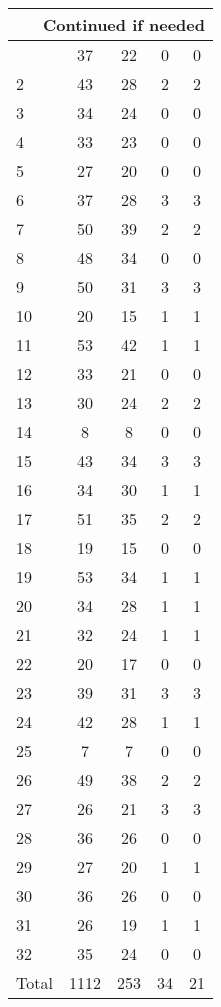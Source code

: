 \begin{center}
\begin{longtable}{l|c|c|c|c}
\hline \multicolumn{5}{|r|}{{Continued if needed}} \\ \hline
\endfoot 
1 & 37 & 22 & 0 & 0\\ \hline
2 & 43 & 28 & 2 & 2\\ \hline
3 & 34 & 24 & 0 & 0\\ \hline
4 & 33 & 23 & 0 & 0\\ \hline
5 & 27 & 20 & 0 & 0\\ \hline
6 & 37 & 28 & 3 & 3\\ \hline
7 & 50 & 39 & 2 & 2\\ \hline
8 & 48 & 34 & 0 & 0\\ \hline
9 & 50 & 31 & 3 & 3\\ \hline
10 & 20 & 15 & 1 & 1\\ \hline
11 & 53 & 42 & 1 & 1\\ \hline
12 & 33 & 21 & 0 & 0\\ \hline
13 & 30 & 24 & 2 & 2\\ \hline
14 & 8 & 8 & 0 & 0\\ \hline
15 & 43 & 34 & 3 & 3\\ \hline
16 & 34 & 30 & 1 & 1\\ \hline
17 & 51 & 35 & 2 & 2\\ \hline
18 & 19 & 15 & 0 & 0\\ \hline
19 & 53 & 34 & 1 & 1\\ \hline
20 & 34 & 28 & 1 & 1\\ \hline
21 & 32 & 24 & 1 & 1\\ \hline
22 & 20 & 17 & 0 & 0\\ \hline
23 & 39 & 31 & 3 & 3\\ \hline
24 & 42 & 28 & 1 & 1\\ \hline
25 & 7 & 7 & 0 & 0\\ \hline
26 & 49 & 38 & 2 & 2\\ \hline
27 & 26 & 21 & 3 & 3\\ \hline
28 & 36 & 26 & 0 & 0\\ \hline
29 & 27 & 20 & 1 & 1\\ \hline
30 & 36 & 26 & 0 & 0\\ \hline
31 & 26 & 19 & 1 & 1\\ \hline
32 & 35 & 24 & 0 & 0\\ \hline
\hline \hline
Total & 1112 & 253 & 34 & 21



\end{longtable}
\end{center}


